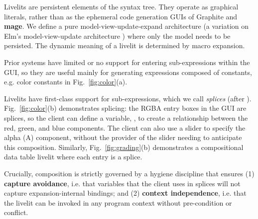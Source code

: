   Livelits are persistent elements of the syntax tree. They operate as  
  graphical literals, rather than as the ephemeral code generation GUIs of Graphite and \textbf{mage}. 
  We define a pure model-view-update-expand architecture
  (a variation on Elm's model-view-update architecture \cite{ElmArchitecture}) 
  where only the model needs to be persisted.
  The dynamic meaning of a livelit is determined by macro expansion.

  Prior systems have limited or no support for {entering sub-expressions within the GUI}, 
  so they are useful mainly for generating expressions composed of constants,
  e.g. color constants in Fig.~\ref{fig:color}(a).

  Livelits have first-class support for sub-expressions, which we call \emph{splices} (after
   \citet{TLMs}).
  Fig.~\ref{fig:color}(b) demonstrates splicing: the RGBA entry boxes in the GUI 
  are splices, so the client can define a variable, ,
  to create a relationship between the red, green, and blue components.
  The client can also use a slider to specify the alpha (A) component, 
  without the provider of the  slider 
  needing to anticipate this composition. 
  Similarly, Fig.~\ref{fig:grading}(b) demonstrates a 
  compositional data table livelit where each entry is a splice.
  
  Crucially, composition is strictly 
  governed by a hygiene discipline that ensures
  (1) \textbf{capture avoidance}, i.e. that variables that the client uses in splices 
  will not capture expansion-internal bindings; and 
  (2) \textbf{context independence}, i.e. that the livelit 
  can be invoked in any program context without pre-condition or conflict.

